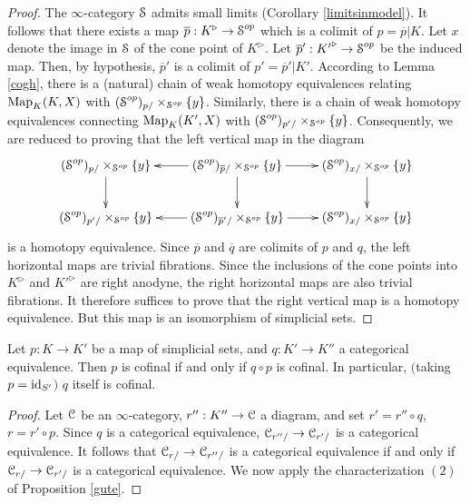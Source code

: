 \begin{proof}
The $\infty$-category $\operatorname{\mathcal{S}}$ admits small limits (Corollary \ref{limitsinmodel}). It follows that there exists a map
$\overline{p}: K^{\triangleright} \rightarrow \operatorname{\mathcal{S}}^{op}$ which is a colimit of $p = \overline{p}|K$. Let $x$
denote the image in $\operatorname{\mathcal{S}}$ of the cone point of $K^{\triangleright}$. Let $\overline{p}': {K'}^{\triangleright} \rightarrow \operatorname{\mathcal{S}}^{op}$ be the induced map. Then, by hypothesis, $\overline{p}'$ is a colimit of 
$p' = \overline{p}'|K'$. According to Lemma \ref{cogh}, there is a (natural) chain of weak homotopy equivalences relating $\operatorname{{Map}}_{K}(K,X)$ with $(\operatorname{\mathcal{S}}^{op})_{p/} \times_{ \operatorname{\mathcal{S}}^{op}} \{y\}$. 
Similarly, there is a chain of weak homotopy equivalences connecting $\operatorname{{Map}}_{K}(K',X)$ with
$(\operatorname{\mathcal{S}}^{op})_{p'/} \times _{\operatorname{\mathcal{S}}^{op}} \{y\}$. Consequently, we are reduced to proving that the left vertical map in the diagram
$$ \xymatrix{ (\SSet^{op})_{p/} \times_{\SSet^{op}} \{y\} \ar[d] & (\SSet^{op})_{\overline{p}/} \times_{\SSet^{op}} \{y\} \ar[l] \ar[r] \ar[d] & (\SSet^{op})_{x/} \times_{ \SSet^{op} } \{y\} \ar[d] \\
(\SSet^{op})_{p'/} \times_{\SSet^{op}} \{y\} & (\SSet^{op})_{\overline{p}'/} \times_{\SSet^{op}} \{y\} \ar[l] \ar[r]  & (\SSet^{op})_{x/} \times_{ \SSet^{op} } \{y\} } $$
is a homotopy equivalence. Since $\overline{p}$ and $\overline{q}$ are colimits of $p$ and $q$, the left horizontal maps are trivial fibrations. Since the inclusions of the cone points into $K^{\triangleright}$ and
${K'}^{\triangleright}$ are right anodyne, the right horizontal maps are also trivial fibrations.
It therefore suffices to prove that the right vertical map is a homotopy equivalence. But this map is an isomorphism of simplicial sets.
\end{proof}

\begin{corollary}\label{stoog}
Let $p: K \rightarrow K'$ be a map of simplicial sets, and
$q: K' \rightarrow K''$ a categorical equivalence. Then $p$
is cofinal if and only if $q \circ p$ is cofinal. In particular, $($taking $p = \operatorname{id}_{S'}${}$)$
$q$ itself is cofinal.
\end{corollary}

\begin{proof}
Let $\operatorname{\mathcal{C}}$ be an $\infty$-category, $r'': K'' \rightarrow \operatorname{\mathcal{C}}$ a diagram, and
set $r' = r'' \circ q$, $r = r' \circ p$. Since $q$ is a categorical equivalence, $\operatorname{\mathcal{C}}_{r''/}
\rightarrow \operatorname{\mathcal{C}}_{r'/}$ is a categorical equivalence. It follows that $\operatorname{\mathcal{C}}_{r/} \rightarrow \operatorname{\mathcal{C}}_{r''/}$ is a categorical equivalence if and only if $\operatorname{\mathcal{C}}_{r/} \rightarrow \operatorname{\mathcal{C}}_{r'/}$ is a categorical equivalence. We now apply the characterization $(2)$ of Proposition \ref{gute}.
\end{proof}

